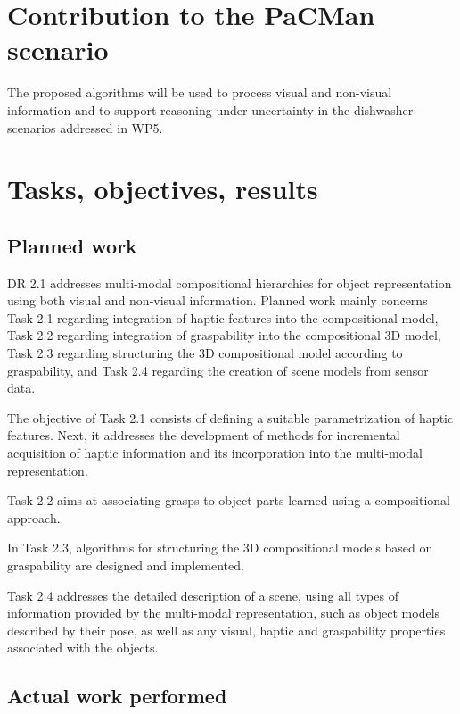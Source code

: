 \documentclass[a4paper,11pt,pdf]{pacmanreport}
\begin{document}
\section*{Contribution to the PaCMan scenario}

The proposed algorithms will be used to process visual and non-visual information and to support reasoning under uncertainty in the dishwasher-scenarios addressed in WP5.

\newpage

\section{Tasks, objectives, results}

\subsection{Planned work}

DR 2.1 addresses multi-modal compositional hierarchies for object representation using both visual and non-visual information. Planned work mainly concerns Task 2.1 regarding integration of haptic features into the compositional model, Task 2.2 regarding integration of graspability into the compositional 3D model, Task 2.3 regarding structuring the 3D compositional model according to graspability, and Task 2.4 regarding the creation of scene models from sensor data.

The objective of Task 2.1 consists of defining a suitable parametrization of haptic features. Next, it addresses the development of methods for incremental acquisition of haptic information and its incorporation into the multi-modal representation. 

Task 2.2 aims at associating grasps to object parts learned using a compositional approach.

In Task 2.3, algorithms for structuring the 3D compositional models based on graspability are designed and implemented.

Task 2.4 addresses the detailed description of a scene, using all types of information provided by the multi-modal representation, such
as object models described by their pose, as well as any visual, haptic and graspability properties associated with the objects.

\subsection{Actual work performed}
\end{document}
